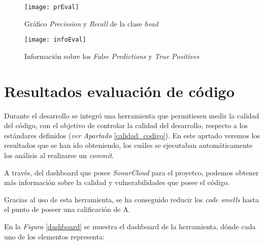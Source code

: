 \begin{figure}[!h]
    \centering
    \texttt{[image: prEval]}
    \caption{Gráfico \textit{Precission} y \textit{Recall} de la clase \textit{head}}\label{fig:prEval}

\end{figure}

\begin{figure}[!h]
    \centering
    \texttt{[image: infoEval]}
    \caption{Información sobre los \textit{False Predictions} y \textit{True Positives}}\label{fig:infoEval}
\end{figure}

\clearpage

\section{Resultados evaluación de código} 
Durante el desarrollo se integró una herramienta que permitiesen medir la calidad del código, con el objetivo de controlar la calidad del desarrollo, respecto a los estándares definidos (\textit{ver Apartado }\ref{calidad_codigo}).
En este aprtado veremos los resultados que se han ido obteniendo, los cuáles se ejecutaban automáticamente los análisis al realizarse un \textit{commit}.


A través, del dashboard que posee \textit{SonarCloud} para el proyetco, podemos obtener más información sobre la calidad y vulnerabilidades que posee el código.

 \label{dashboard}


Gracias al uso de esta herramienta, se ha conseguido reducir los \textit{code smells} hasta el punto de poseer una calificación de A.

En la \textit{Figura} \ref{dashboard} se muestra el dashboard de la herramienta, dónde cada uno de los elementos representa:

